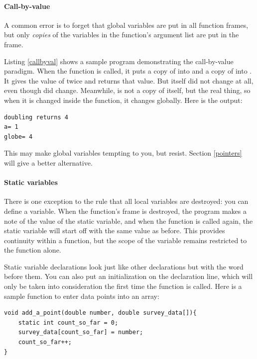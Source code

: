 
\paragraph{Call-by-value} 
A common error is to forget that global variables are put in all function
frames, but only {\sl copies} of the variables in the function's argument
list are put in the frame.  

Listing \ref{callbyval} shows a sample program demonstrating the
call-by-value paradigm.  
When the  function is called, it puts a copy of  into  and a copy of 
into . It gives  the value of twice  and returns that value. But 
itself did not change at all, even though  did change. Meanwhile,  is not a copy of
itself, but the real thing, so when it is changed inside the function, it changes globally.
Here is the output:
\begin{lstlisting}
doubling returns 4
a= 1
globe= 4
\end{lstlisting}

This may make global variables tempting to you, but resist. Section \ref{pointers} will give a better
alternative.

\paragraph{\treesymbol Static variables} There is one exception to the rule that
all local variables are destroyed: you can define a 
variable. When the function's frame is destroyed, the program makes a
note of the value of the  static variable, and when the function is called
again, the static variable will start off with the same value
as before. This provides continuity within a function, but the scope
of the variable remains restricted to the function alone.

Static variable declarations look just like other declarations but with
the word  before them. You can also put an initialization on
the declaration line, which will only be taken into consideration the
first time the function is called. Here is a sample function to enter 
data points into an array:
\begin{lstlisting}
void add_a_point(double number, double survey_data[]){
    static int count_so_far = 0;
    survey_data[count_so_far] = number;
    count_so_far++;
}
\end{lstlisting}

